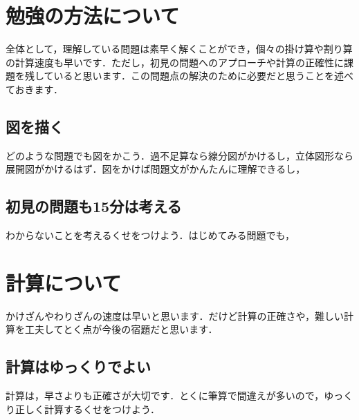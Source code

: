 \documentclass[a4j]{article}
\begin{document}
\section{勉強の方法について}
全体として，理解している問題は素早く解くことができ，個々の掛け算や割り算の計算速度も早いです．ただし，初見の問題へのアプローチや計算の正確性に課題を残していると思います．この問題点の解決のために必要だと思うことを述べておきます．

\subsection{図を描く}
どのような問題でも図をかこう．過不足算なら線分図がかけるし，立体図形なら展開図がかけるはず．図をかけば問題文がかんたんに理解できるし，


\subsection{初見の問題も15分は考える}
わからないことを考えるくせをつけよう．はじめてみる問題でも，










\section{計算について}
かけざんやわりざんの速度は早いと思います．だけど計算の正確さや，難しい計算を工夫してとく点が今後の宿題だと思います．
\subsection{計算はゆっくりでよい}
計算は，早さよりも正確さが大切です．とくに筆算で間違えが多いので，ゆっくり正しく計算するくせをつけよう．
\end{document}
